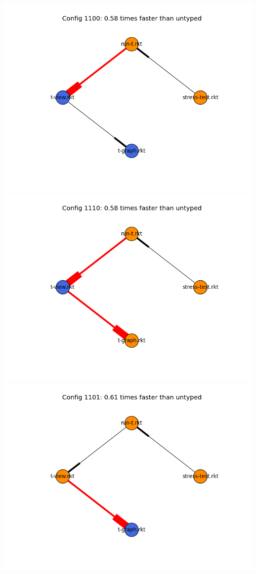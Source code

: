 \documentclass{article}
\begin{document}
\includegraphics[width=\textwidth]{mbta-04-20-ben-module-graph-1100.png}
\includegraphics[width=\textwidth]{mbta-04-20-ben-module-graph-1110.png}
\includegraphics[width=\textwidth]{mbta-04-20-ben-module-graph-1101.png}
\end{document}
